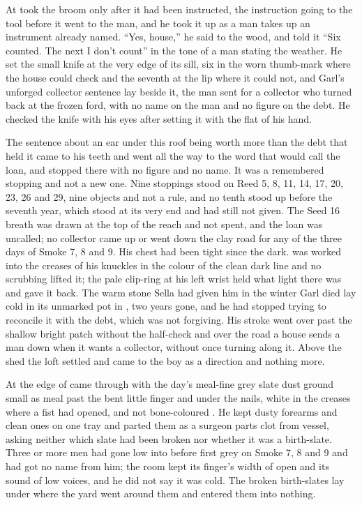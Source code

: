 \scenebreak

At   took the broom only after it had been instructed, the instruction going to the tool before it went to the man, and he took it up as a man takes up an instrument already named. “Yes, house,” he said to the wood, and told it “Six counted. The next I don't count” in the tone of a man stating the weather. He set the small knife at the very edge of its sill, six in the worn thumb-mark where the house could check and the seventh at the lip where it could not, and Garl's unforged collector sentence lay beside it, the man sent for a collector who turned back at the frozen ford, with no name on the man and no figure on the debt. He checked the knife with his eyes after setting it with the flat of his hand.

The sentence about an ear under this roof being worth more than the debt that held it came to his teeth and went all the way to the word that would call the loan, and stopped there with no figure and no name. It was a remembered stopping and not a new one. Nine stoppings stood on Reed 5, 8, 11, 14, 17, 20, 23, 26 and 29, nine objects and not a rule, and no tenth stood up before the seventh year, which stood at its very end and had still not given. The Seed 16 breath was drawn at the top of the reach and not spent, and the loan was uncalled; no collector came up or went down the clay road for any of the three days of Smoke 7, 8 and 9. His chest had been tight since the dark.  was worked into the creases of his knuckles in the colour of the clean dark line and no scrubbing lifted it; the pale clip-ring at his left wrist held what light there was and gave it back. The warm stone Sella had given him in the winter Garl died lay cold in its unmarked pot in , two years gone, and he had stopped trying to reconcile it with the debt, which was not forgiving. His stroke went over  past the shallow bright patch without the half-check and over the road a house sends a man down when it wants a collector, without once turning along it. Above the shed the loft settled and came to the boy as a direction and nothing more.

At the edge of   came through with the day's meal-fine grey slate dust ground small as meal past the bent little finger and under the nails, white in the creases where a fist had opened, and not bone-coloured . He kept dusty forearms and clean ones on one tray and parted them as a surgeon parts clot from vessel, asking neither which slate had been broken nor whether it was a birth-slate. Three or more men had gone low into  before first grey on Smoke 7, 8 and 9 and had got no name from him; the room kept its finger's width of open and its sound of low voices, and he did not say it was cold. The broken birth-slates lay under  where the yard went around them and entered them into nothing.

